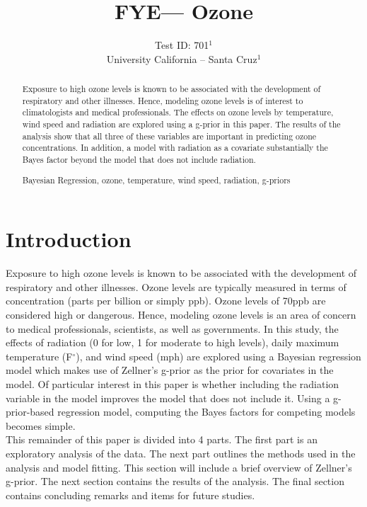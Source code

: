 \documentclass{../../tex_template/asaproc}
\title{FYE--- Ozone}
\author{
  Test ID: 701$^1$\\
  University California -- Santa Cruz$^1$\\
}
\begin{document}
\maketitle
\begin{abstract}
Exposure to high ozone levels is known to be associated with the development
of respiratory and other illnesses. Hence, modeling ozone levels is of interest
to climatologists and medical professionals. The effects on ozone levels by
temperature, wind speed and radiation are explored using a g-prior in this 
paper. The results of the analysis show that all three of these variables are
important in predicting ozone concentrations. In addition, a model with
radiation as a covariate substantially the Bayes factor beyond the model
that does not include radiation.

\begin{keywords}
Bayesian Regression, ozone, temperature, wind speed, radiation, g-priors
\end{keywords}
\end{abstract}

\section{Introduction}
Exposure to high ozone levels is known to be associated with the development of
respiratory and other illnesses. Ozone levels are typically measured in terms
of concentration (parts per billion or simply ppb). Ozone levels of 70ppb are
considered high or dangerous. Hence, modeling ozone levels is an area of
concern to medical professionals, scientists, as well as governments. In this
study, the effects of radiation (0 for low, 1 for moderate to high levels),
daily maximum temperature (F$^\circ$), and wind speed (mph) are explored using
a Bayesian regression model which makes use of Zellner's g-prior as the prior
for covariates in the model. Of particular interest in this paper is whether
including the radiation variable in the model improves the model that does not
include it.  Using a g-prior-based regression model, computing the Bayes
factors for competing models becomes simple.\\

This remainder of this paper is divided into 4 parts. The first part is an 
exploratory analysis of the data. The next part outlines the methods used in
the analysis and model fitting. This section will include a brief overview
of Zellner's g-prior. The next section contains the results of the analysis.
The final section contains concluding remarks and items for future studies.
\end{document}
